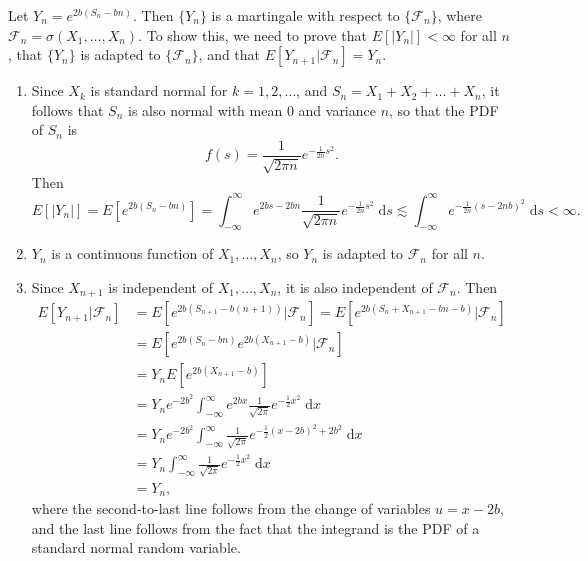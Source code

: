 \documentclass{homework}
\newcommand{\fil}{\mathcal{F}}
\begin{document}
	\question Let $Y_n = e^{2b(S_n-bn)}$. Then $\{Y_n\}$ is a martingale with respect to $\{\fil_n\}$, where $\fil_n = \sigma(X_1,\dots,X_n)$. To show this, we need to prove that $E[|Y_n|] < \infty$ for all $n$, that $\{Y_n\}$ is adapted to $\{\fil_n\}$, and that $E[Y_{n+1}|\fil_n] = Y_n$.
	\begin{enumerate}
		\item Since $X_k$ is standard normal for $k=1,2,\dots$, and $S_n = X_1+X_2+\dots + X_n$, it follows that $S_n$ is also normal with mean 0 and variance $n$, so that the PDF of $S_n$ is
		\begin{equation*}
			f(s) = \frac{1}{\sqrt{2\pi n}}e^{-\frac{1}{2n}s^2}.
		\end{equation*}
		Then
		\begin{equation*}
			E[|Y_n|] = E\left[e^{2b(S_n - bn)}\right] = \int_{-\infty}^\infty e^{2bs - 2bn} \frac{1}{\sqrt{2\pi n}}e^{-\frac{1}{2n}s^2}\;\text{d}s \lesssim \int_{-\infty}^\infty e^{-\frac{1}{2n}(s - 2nb)^2}\;\text{d}s < \infty.
		\end{equation*}
		\item $Y_n$ is a continuous function of $X_1,\dots,X_n$, so $Y_n$ is adapted to $\fil_n$ for all $n$.
		\item Since $X_{n+1}$ is independent of $X_1,\dots, X_n$, it is also independent of $\fil_n$. Then
		\begin{align*}
			E[Y_{n+1}\big|\fil_n] &= E\left[e^{2b(S_{n+1} - b(n+1))}\big|\fil_n\right] = E\left[e^{2b(S_n + X_{n+1} - bn - b)}|\fil_n\right] \\[0.5em]
			&= E\left[e^{2b(S_n-bn)}e^{2b(X_{n+1} -b)}\big|\fil_n\right] \\
			&= Y_nE\left[e^{2b(X_{n+1}-b)}\right] \\
			&= Y_n e^{-2b^2}\int_{-\infty}^\infty e^{2bx}\frac{1}{\sqrt{2\pi}}e^{-\frac{1}{2}x^2}\;\text{d}x \\
			&= Y_n e^{-2b^2}\int_{-\infty}^\infty\frac{1}{\sqrt{2\pi}}e^{-\frac{1}{2}(x-2b)^2+2b^2}\;\text{d}x \\
			&= Y_n\int_{-\infty}^\infty \frac{1}{\sqrt{2\pi}}e^{-\frac{1}{2}x^2}\;\text{d}x \\
			&= Y_n,
		\end{align*}
		where the second-to-last line follows from the change of variables $u = x-2b$, and the last line follows from the fact that the integrand is the PDF of a standard normal random variable.
	\end{enumerate}
	
\end{document}
